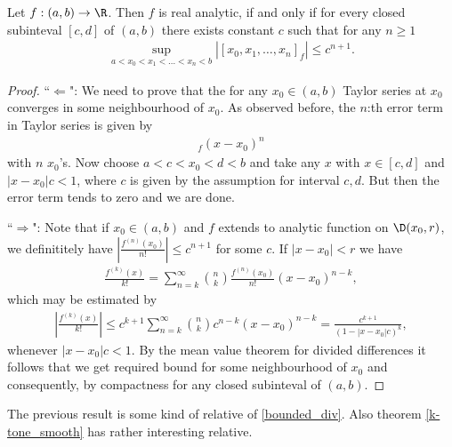 \begin{lause}\label{div_anal}
	Let $f : (a, b) \to \R$. Then $f$ is real analytic, if and only if for every closed subinteval $[c, d]$ of $(a, b)$ there exists constant $c$ such that for any $n \geq 1$
	\begin{align*}
		\sup_{a < x_{0} < x_{1} < \ldots < x_{n}< b} |[x_{0}, x_{1}, \ldots, x_{n}]_{f}| \leq c^{n + 1}.
	\end{align*}
\end{lause}
\begin{proof}
	``$\Leftarrow$": We need to prove that the for any $x_{0} \in (a, b)$ Taylor series at $x_{0}$ converges in some neighbourhood of $x_{0}$. As observed before, the $n$:th error term in Taylor series is given by
	\begin{align*}
		[x, x_{0}, x_{0}, \ldots, x_{0}]_{f} (x - x_{0})^{n}
	\end{align*}
	with $n$ $x_{0}$'s. Now choose $a < c < x_{0} < d < b$ and take any $x$ with $x \in [c, d]$ and $|x - x_{0}| c < 1$, where $c$ is given by the assumption for interval $c, d$. But then the error term tends to zero and we are done.

	``$\Rightarrow$": Note that if $x_{0} \in (a, b)$ and $f$ extends to analytic function on $\D(x_{0}, r)$, we definititely have $\left|\frac{f^{(n)}(x_{0})}{n!}\right| \leq c^{n + 1}$ for some $c$. If $|x - x_{0}| < r$ we have
	\begin{align*}
		\frac{f^{(k)}(x)}{k!} = \sum_{n = k}^{\infty} \binom{n}{k} \frac{f^{(n)}(x_{0})}{n!} (x - x_{0})^{n - k},
	\end{align*}
	which may be estimated by
	\begin{align*}
	 \left|\frac{f^{(k)}(x)}{k!}\right| \leq c^{k + 1}\sum_{n = k}^{\infty} \binom{n}{k} c^{n - k} (x - x_{0})^{n - k} = \frac{c^{k + 1} }{(1 - |x - x_{0}| c)^{k}},
	\end{align*}
	whenever $|x - x_{0}| c < 1$. By the mean value theorem for divided differences it follows that we get required bound for some neighbourhood of $x_{0}$ and consequently, by compactness for any closed subinteval of $(a, b)$.
\end{proof}

The previous result is some kind of relative of \ref{bounded_div}. Also theorem \ref{k-tone_smooth} has rather interesting relative.

